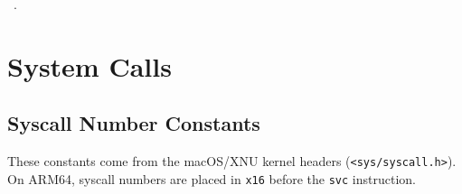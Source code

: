 \documentclass[11pt,a4paper,twoside,openright,DIV=15]{scrbook}
\theoremstyle{definition}
\theoremstyle{plain}
\theoremstyle{remark}
\newcommand{\reg}[1]{\texttt{#1}}
\begin{document}
\begin{flushleft}
\begin{minipage}{\linewidth}
\vspace{-1.5ex}
\footnotesize
\begin{list}{}{\setlength{\itemsep}{-\parsep}\setlength{\itemindent}{-\leftmargin}}
\item \NWtxtMacroRefIn\ .

\item{}
\end{list}
\end{minipage}\vspace{4ex}
\end{flushleft}
%
%

\chapter{System Calls}
\label{ch:syscalls}

\section{Syscall Number Constants}

These constants come from the macOS/XNU kernel headers
(\texttt{<sys/syscall.h>}).  On ARM64, syscall numbers are placed
in \reg{x16} before the \texttt{svc} instruction.
\end{document}
